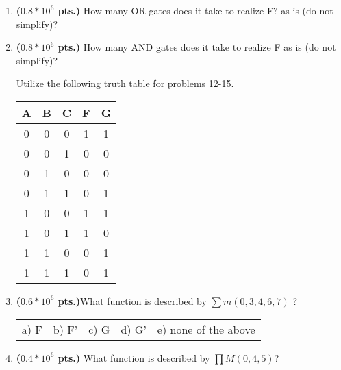 \documentclass{article}
\begin{document}
\begin{enumerate}
\item {\bf ($0.8*10^6$ pts.)} How many OR gates does it take to realize F?
as is (do not simplify)?

\item {\bf ($0.8*10^6$ pts.)} How many AND gates does it take to realize F 
as is (do not simplify)?

\pagebreak
\underline{Utilize the following truth table for problems 12-15.}

\begin{tabular}{c|c|c||c|c}
A & B & C & F & G \\ \hline \hline
0 & 0 & 0 & 1 & 1 \\ \hline
0 & 0 & 1 & 0 & 0 \\ \hline
0 & 1 & 0 & 0 & 0 \\ \hline
0 & 1 & 1 & 0 & 1 \\ \hline
1 & 0 & 0 & 1 & 1 \\ \hline
1 & 0 & 1 & 1 & 0 \\ \hline
1 & 1 & 0 & 0 & 1 \\ \hline
1 & 1 & 1 & 0 & 1 \\
\end{tabular} 


\item {\bf ($0.6*10^6$ pts.)}What function is described by $\sum m(0,3,4,6,7)$ ?

\begin{tabular}{p{0.7in} p{0.7in} p{0.7in} p{0.7in} l}
a) F & b) F' & c) G & d) G' & e) none of the above
\end{tabular}

\item {\bf ($0.4*10^6$ pts.)} What function is described by $\prod M(0,4,5)$?


\end{enumerate}
\end{document}
